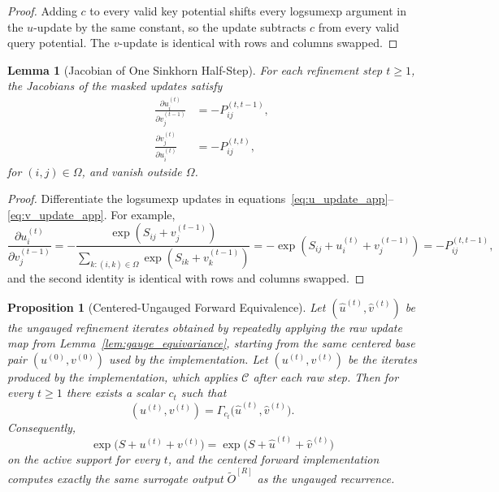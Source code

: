 \documentclass{article}
\newtheorem{proposition}{Proposition}
\newtheorem{lemma}{Lemma}
\begin{document}
\begin{proof}
Adding $c$ to every valid key potential shifts every logsumexp argument in the $u$-update by the same constant, so the update subtracts $c$ from every valid query potential. The $v$-update is identical with rows and columns swapped.
\end{proof}

\begin{lemma}[Jacobian of One Sinkhorn Half-Step]\label{lem:half_step_jacobian}
For each refinement step $t \geq 1$, the Jacobians of the masked updates satisfy
\begin{align}
    \frac{\partial u^{(t)}_i}{\partial v^{(t-1)}_j} &= -P^{(t,t-1)}_{ij}, \\
    \frac{\partial v^{(t)}_j}{\partial u^{(t)}_i} &= -P^{(t,t)}_{ij},
\end{align}
for $(i,j)\in\Omega$, and vanish outside $\Omega$.
\end{lemma}

\begin{proof}
Differentiate the logsumexp updates in equations~\eqref{eq:u_update_app}--\eqref{eq:v_update_app}. For example,
\[
\frac{\partial u^{(t)}_i}{\partial v^{(t-1)}_j}
=
-
\frac{\exp(S_{ij} + v^{(t-1)}_j)}{\sum_{k:(i,k)\in\Omega}\exp(S_{ik} + v^{(t-1)}_k)}
=
-\exp(S_{ij} + u^{(t)}_i + v^{(t-1)}_j)
=
-P^{(t,t-1)}_{ij},
\]
and the second identity is identical with rows and columns swapped.
\end{proof}

\begin{proposition}[Centered-Ungauged Forward Equivalence]\label{prop:centered_equivalence}
Let $(\widehat u^{(t)}, \widehat v^{(t)})$ be the ungauged refinement iterates obtained by repeatedly applying the raw update map from Lemma~\ref{lem:gauge_equivariance}, starting from the same centered base pair $(u^{(0)}, v^{(0)})$ used by the implementation. Let $(u^{(t)}, v^{(t)})$ be the iterates produced by the implementation, which applies $\mathcal{C}$ after each raw step. Then for every $t \geq 1$ there exists a scalar $c_t$ such that
\[
(u^{(t)}, v^{(t)}) = \Gamma_{c_t}\bigl(\widehat u^{(t)}, \widehat v^{(t)}\bigr).
\]
Consequently,
\[
\exp\!\bigl(S + u^{(t)} + v^{(t)}\bigr)
=
\exp\!\bigl(S + \widehat u^{(t)} + \widehat v^{(t)}\bigr)
\]
on the active support for every $t$, and the centered forward implementation computes exactly the same surrogate output $\widetilde O^{[R]}$ as the ungauged recurrence.
\end{proposition}
\end{document}
